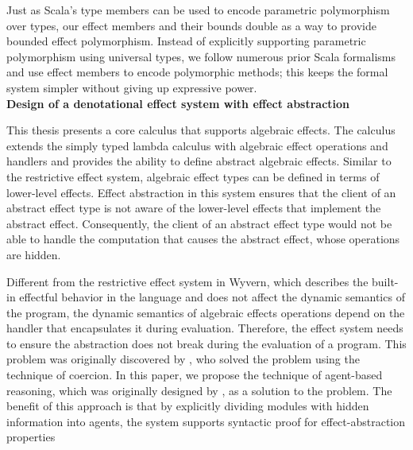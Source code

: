  Just as Scala's type members can be used to encode parametric polymorphism over types, our effect members and their bounds double as a way to provide bounded effect polymorphism. Instead of explicitly supporting parametric polymorphism using universal types, we follow numerous prior Scala formalisms and use effect members to encode polymorphic methods; this keeps the formal system simpler without giving up expressive power. \\


\noindent\textbf{Design of a denotational effect system with effect abstraction}  

This thesis presents a core calculus that supports algebraic effects. The calculus extends the simply typed lambda calculus with algebraic effect operations and handlers and provides the ability to define abstract algebraic effects. Similar to the restrictive effect system, algebraic effect types can be defined in terms of lower-level effects. Effect abstraction in this system ensures that the client of an abstract effect type is not aware of the lower-level effects that implement the abstract effect. Consequently, the client of an abstract effect type would not be able to handle the computation that causes the abstract effect, whose operations are hidden.

Different from the restrictive effect system in Wyvern, which describes the built-in effectful behavior in the language and does not affect the dynamic semantics of the program, the dynamic semantics of algebraic effects operations depend on the handler that encapsulates it during evaluation.  Therefore, the effect system needs to ensure the abstraction does not break during the evaluation of a program. This problem was originally discovered by \citet{biernacki19}, who solved the problem using the technique of coercion. In this paper, we propose the technique of agent-based reasoning, which was originally designed by \citet{grossman00}, as a solution to the problem. The benefit of this approach is that by explicitly dividing modules with hidden information into agents, the system supports syntactic proof for effect-abstraction properties \\

